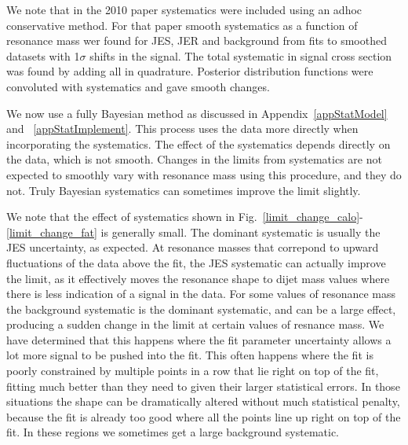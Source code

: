 We note that in the 2010 paper systematics were included using an adhoc conservative method. For that paper 
smooth systematics as a function of resonance mass wer found for JES, JER and background from fits to smoothed
datasets with 1$\sigma$ shifts in the signal.  The total systematic in signal cross section was found by 
adding all in quadrature. Posterior distribution functions were convoluted with systematics and gave smooth
changes.  

We now use a fully Bayesian method as discussed in Appendix~\ref{appStatModel} and ~\ref{appStatImplement}.
This process uses the data more directly when incorporating the systematics.  The effect of the systematics
depends directly on the data, which is not smooth. Changes in the limits from systematics are not expected 
to smoothly vary with resonance mass using this procedure, and they do not.  Truly Bayesian systematics can
sometimes improve the limit slightly.

We note that the effect of systematics shown in Fig.~\ref{limit_change_calo}-\ref{limit_change_fat} is generally small.  
The dominant systematic is usually the JES
uncertainty, as expected.  At resonance masses that correpond to upward fluctuations of the data above the fit,
the JES systematic can actually improve the limit, as it effectively moves the resonance shape to dijet mass 
values where there is less indication of a signal in the data.  For some values of resonance mass the background
systematic is the dominant systematic, and can be a large effect, producing a sudden change in the limit at certain
values of resnance mass.  We have determined that this happens where the fit parameter uncertainty allows a lot
more signal to be pushed into the fit.  This often happens where the fit is poorly constrained by multiple points
in a row that lie right on top of the fit, fitting much better than they need to given their larger statistical 
errors. In those situations the shape can be dramatically altered without much statistical penalty, because the
fit is already too good where all the points line up right on top of the fit.  In these regions we sometimes get
a large background systematic.  



